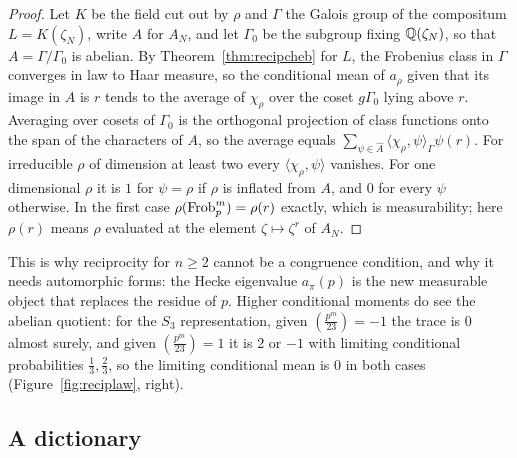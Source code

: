 \begin{proof}
Let $K$ be the field cut out by $\rho$ and $\Gamma$ the Galois group of the compositum $L=K(\zeta_N)$, write $A$ for $A_N$, and let $\Gamma_0$ be the subgroup fixing $\mathbb{Q}(\zeta_N)$, so that $A=\Gamma/\Gamma_0$ is abelian. By Theorem~\ref{thm:recipcheb} for $L$, the Frobenius class in $\Gamma$ converges in law to Haar measure, so the conditional mean of $a_\rho$ given that its image in $A$ is $r$ tends to the average of $\chi_\rho$ over the coset $g\Gamma_0$ lying above $r$. Averaging over cosets of $\Gamma_0$ is the orthogonal projection of class functions onto the span of the characters of $A$, so the average equals $\sum_{\psi\in\hat A}\langle\chi_\rho,\psi\rangle_\Gamma\psi(r)$. For irreducible $\rho$ of dimension at least two every $\langle\chi_\rho,\psi\rangle$ vanishes. For one dimensional $\rho$ it is $1$ for $\psi=\rho$ if $\rho$ is inflated from $A$, and $0$ for every $\psi$ otherwise. In the first case $\rho(\operatorname{Frob}_p^m)=\rho(r)$ exactly, which is measurability; here $\rho(r)$ means $\rho$ evaluated at the element $\zeta\mapsto\zeta^r$ of $A_N$.
\end{proof}

This is why reciprocity for $n\ge2$ cannot be a congruence condition, and why it needs automorphic forms: the Hecke eigenvalue $a_\pi(p)$ is the new measurable object that replaces the residue of $p$. Higher conditional moments do see the abelian quotient: for the $S_3$ representation, given $(\frac{p^m}{23})=-1$ the trace is $0$ almost surely, and given $(\frac{p^m}{23})=1$ it is $2$ or $-1$ with limiting conditional probabilities $\frac13,\frac23$, so the limiting conditional mean is $0$ in both cases (Figure~\ref{fig:reciplaw}, right).

\subsection{A dictionary}

